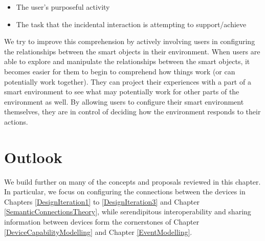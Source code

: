 	\begin{itemize}
	\item The user's purposeful activity
	\item The task that the incidental interaction is attempting to support/achieve
	\end{itemize}

We try to improve this comprehension by actively involving users in configuring the relationships between the smart objects in their environment. When users are able to explore and manipulate the relationships between the smart objects, it becomes easier for them to begin to comprehend how things work (or can potentially work together). They can project their experiences with a part of a smart environment to see what may potentially work for other parts of the environment as well. %
By allowing users to configure their smart environment themselves, they are in control of deciding how the environment responds to their actions.


\section{Outlook}

We build further on many of the concepts and proposals reviewed in this chapter. In particular, we focus on configuring the connections between the devices in Chapters \ref{DesignIteration1} to \ref{DesignIteration3} and Chapter \ref{SemanticConnectionsTheory}, while serendipitous interoperability and sharing information between devices form the cornerstones of Chapter \ref{DeviceCapabilityModelling} and Chapter \ref{EventModelling}. 